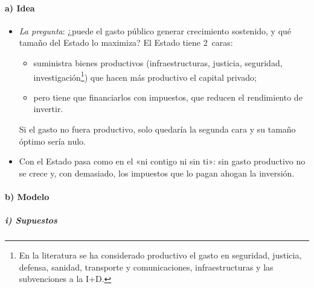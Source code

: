 \documentclass[11pt]{article}
\begin{document}
\paragraph{a) Idea}

\begin{itemize}
\item \emph{La pregunta}: ¿puede el gasto público generar crecimiento sostenido, y qué tamaño del Estado lo maximiza? El Estado tiene 2~caras:
  \begin{itemize}
  \item suministra bienes productivos (infraestructuras, justicia, seguridad, investigación\footnote{En la literatura se ha considerado productivo el gasto en seguridad, justicia, defensa, sanidad, transporte y comunicaciones, infraestructuras y las subvenciones a la I+D.}) que hacen más productivo el capital privado;
  \item pero tiene que financiarlos con impuestos, que reducen el rendimiento de invertir.
  \end{itemize}
  Si el gasto no fuera productivo, solo quedaría la segunda cara y su tamaño óptimo sería nulo.
\item Con el Estado pasa como en el «ni contigo ni sin ti»: sin gasto productivo no se crece y, con demasiado, los impuestos que lo pagan ahogan la inversión.
\end{itemize}

\paragraph{b) Modelo}

\subparagraph{i) Supuestos}
\end{document}
